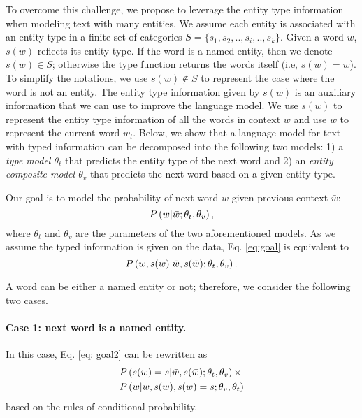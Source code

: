 \documentclass[11pt,a4paper]{article}
\begin{document}
To overcome this challenge, we propose to leverage the entity type information when modeling text with many entities. 
We assume each entity is associated with an entity type in a finite set of categories $S = \{s_1,s_2, .., s_i, .., s_k\}$. Given a word $w$, $s(w)$ reflects its entity type. If the word is a named entity, then we denote $s(w) \in S$; otherwise the type function returns the words itself (i.e, $s(w) = w$). To simplify the notations, we use $s(w) \not\in S$ to represent the case where the word is not an entity.
The entity type information given by $s(w)$ is an auxiliary information that we can use to improve the language model. We use $s(\bar{w})$ to represent the entity type information of all the words in context $\bar{w}$ and use $w$ to represent the current word $w_t$. Below, we show that a language model for text with typed information can be decomposed into the following two models: 1) a {\it type model $\theta_t$} that predicts the entity type of the next word and 2) an {\it entity composite model $\theta_v$} that predicts the next word based on a given entity type.  

Our goal is to model the probability of next word $w$ given previous context $\bar{w}$:
\begin{equation}
\label{eq:goal}
P\left(w| \Bar{w}; \theta_t, \theta_v \right),
\end{equation}
where $\theta_t$ and $\theta_v$ are the parameters of the two aforementioned models.
As we assume the typed information is given on the data,
Eq. \eqref{eq:goal} is equivalent to  
\begin{equation}
\label{eq: goal2}
 P\left(w, s(w) | \Bar{w}, s(\Bar{w}); \theta_t, \theta_v \right).
\end{equation}

A word can be either a named entity or not; therefore, we consider the following two cases.  

\paragraph{\bf Case 1: next word is a named entity.} In this case, Eq. \eqref{eq: goal2} can be rewritten as 
\begin{equation}
\label{eq:entity}
    \begin{split}
    &P\left(s(w)=s |\Bar{w}, s(\Bar{w}); \theta_t, \theta_v \right) \times\\
    &P\left(w|\Bar{w}, s(\Bar{w}), s(w)=s; \theta_v, \theta_t \right)          
    \end{split}
\end{equation}
based on the rules of conditional probability. 
\end{document}
